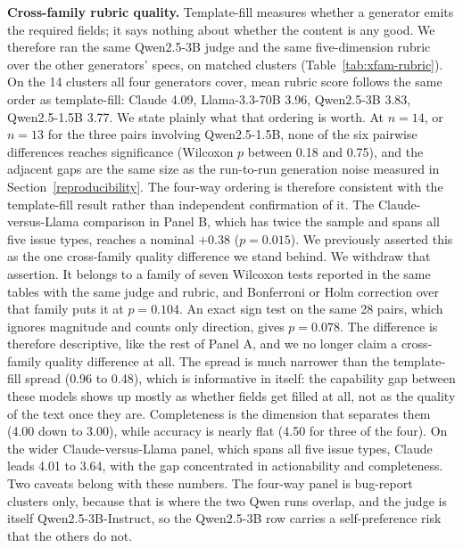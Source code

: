 \documentclass[sigconf, anonymous]{acmart}
\begin{document}
\textbf{Cross-family rubric quality.} Template-fill measures whether a generator emits the
required fields; it says nothing about whether the content is any good. We therefore ran the same
Qwen2.5-3B judge and the same five-dimension rubric over the other generators' specs, on matched
clusters (Table~\ref{tab:xfam-rubric}). On the 14 clusters all four generators cover, mean rubric
score follows the same order as template-fill: Claude 4.09, Llama-3.3-70B 3.96, Qwen2.5-3B 3.83,
Qwen2.5-1.5B 3.77. We state plainly what that ordering is worth. At $n=14$, or $n=13$ for the three pairs involving Qwen2.5-1.5B, none of the six
pairwise differences reaches significance (Wilcoxon $p$ between 0.18 and 0.75), and the adjacent
gaps are the same size as the run-to-run generation noise measured in
Section~\ref{reproducibility}. The four-way ordering is therefore consistent with the
template-fill result rather than independent confirmation of it. The Claude-versus-Llama
comparison in Panel B, which has twice the sample and spans all five issue types, reaches a
nominal $+0.38$ ($p = 0.015$). We previously asserted this as the one cross-family quality
difference we stand behind. We withdraw that assertion. It belongs to a family of seven Wilcoxon
tests reported in the same tables with the same judge and rubric, and Bonferroni or Holm
correction over that family puts it at $p = 0.104$. An exact sign test on the same 28 pairs,
which ignores magnitude and counts only direction, gives $p = 0.078$. The difference is therefore
descriptive, like the rest of Panel A, and we no longer claim a cross-family quality difference
at all. The spread is much narrower than the template-fill spread (0.96 to 0.48),
which is informative in itself: the capability gap between these models shows up mostly as
whether fields get filled at all, not as the quality of the text once they are. Completeness is
the dimension that separates them (4.00 down to 3.00), while accuracy is nearly flat (4.50 for
three of the four). On the wider Claude-versus-Llama panel, which spans all five issue types,
Claude leads 4.01 to 3.64, with the gap concentrated in actionability and completeness. Two
caveats belong with these numbers. The four-way panel is bug-report clusters only, because that
is where the two Qwen runs overlap, and the judge is itself Qwen2.5-3B-Instruct, so the
Qwen2.5-3B row carries a self-preference risk that the others do not.
\end{document}

